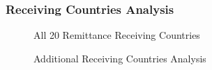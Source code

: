 \documentclass[
  11pt,
]{article}
\begin{document}
\subsubsection{Receiving Countries
Analysis}\label{receiving-countries-analysis-1}

\begin{figure}[H]


\caption{\label{fig-receiving-static}All 20 Remittance Receiving
Countries}

\end{figure}%

\begin{figure}[H]


\caption{\label{fig-receiving-additional}Additional Receiving Countries
Analysis}

\end{figure}%
\end{document}
